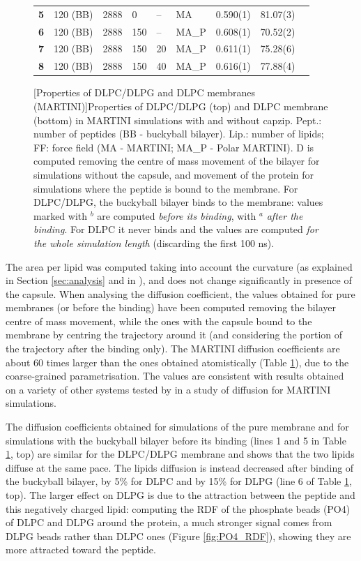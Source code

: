 \begin{figure}
\begin{tabular}{lllllllll}
 \hline
\textbf{5} & 120 (BB) & 2888 & 0 & -- & MA & 0.590(1) & 81.07(3) & \\ 
\textbf{6} & 120 (BB) & 2888 & 150 & -- & MA\_P & 0.608(1) & 70.52(2) &  \\
\textbf{7} & 120 (BB) & 2888 & 150 & 20 & MA\_P & 0.611(1) & 75.28(6) & \\
\textbf{8} & 120 (BB) & 2888 & 150 & 40 & MA\_P & 0.616(1) & 77.88(4) & \\
 \hline
\end{tabular}
\vspace {0.5cm}
[Properties of DLPC/DLPG and DLPC membranes (MARTINI)]{Properties of DLPC/DLPG (top) and DLPC membrane (bottom) in MARTINI simulations with and without capzip. Pept.: number of peptides (BB - buckyball bilayer). Lip.: number of lipids; FF: force field (MA - MARTINI; MA\_P - Polar MARTINI).
%
D is computed removing the centre of mass movement of the bilayer for simulations without the capsule, and movement of the protein for simulations where the peptide is bound to the membrane. For DLPC/DLPG, the buckyball bilayer binds to the membrane: values marked with $^b$ are computed \emph{before its binding}, with $^a$ \emph{after the binding}.
%
For DLPC it never binds and the values are computed \emph{for the whole simulation length} (discarding the first 100 ns).}
\label{table:martini_diff}
\vspace{1.5cm}
\end{figure}

The area per lipid was computed taking into account the curvature (as explained in Section \ref{sec:analysis} and in \citet{Braun2011}), and does not change significantly in presence of the capsule.
%
When analysing the diffusion coefficient, the values obtained for pure membranes (or before the binding) have been computed removing the bilayer centre of mass movement, while the ones with the capsule bound to the membrane by centring the trajectory around it (and considering the portion of the trajectory after the binding only). The MARTINI diffusion coefficients are about 60 times larger than the ones obtained atomistically (Table \ref{table:martini_diff}), due to the coarse-grained parametrisation. The values are consistent with results obtained on a variety of other systems tested by \citet{Venable2017} in a study of diffusion for MARTINI simulations.

The diffusion coefficients obtained for simulations of the pure membrane and for simulations with the buckyball bilayer before its binding (lines 1 and 5 in Table \ref{table:martini_diff}, top) are similar for the DLPC/DLPG membrane and shows that the two lipids diffuse at the same pace.
%
The lipids diffusion is instead decreased after binding of the buckyball bilayer, by 5\% for DLPC and by 15\% for DLPG (line 6 of Table \ref{table:martini_diff}, top). The larger effect on DLPG is due to the attraction between the peptide and this negatively charged lipid: computing the RDF of the phosphate beads (PO4) of DLPC and DLPG around the protein, a much stronger signal comes from DLPG beads rather than DLPC ones (Figure \ref{fig:PO4_RDF}), showing they are more attracted toward the peptide.

